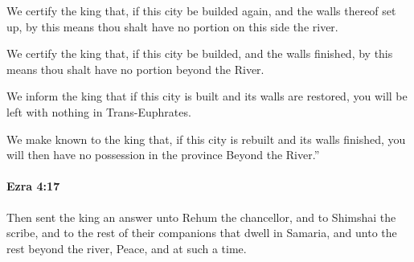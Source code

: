 			We certify the king that, if this city be builded again, and the walls thereof set up, by this means thou shalt have no portion on this side the river.

			\begin{versebox}
					\item[BHS] 
					\item[LXX] 
					\item[ASV] We certify the king that, if this city be builded, and the walls finished, by this means thou shalt have no portion beyond the River.
					\item[NIV] We inform the king that if this city is built and its walls are restored, you will be left with nothing in Trans-Euphrates.
					\item[NRSV] We make known to the king that, if this city is rebuilt and its walls finished, you will then have no possession in the province Beyond the River.”
			\end{versebox}

		\paragraph{Ezra 4:17} %
			\label{EZRA-4-17}

			Then sent the king an answer unto Rehum the chancellor, and to Shimshai the scribe, and to the rest of their companions that dwell in Samaria, and unto the rest beyond the river, Peace, and at such a time.

